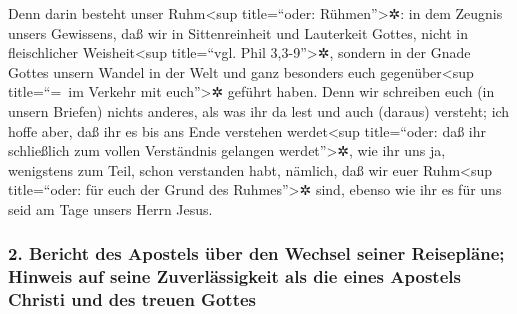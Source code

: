  Denn darin besteht unser Ruhm\textless sup title=``oder:
Rühmen''\textgreater✲: in dem Zeugnis unsers Gewissens, daß wir in
Sittenreinheit und Lauterkeit Gottes, nicht in fleischlicher
Weisheit\textless sup title=``vgl. Phil 3,3-9''\textgreater✲, sondern in
der Gnade Gottes unsern Wandel in der Welt und ganz besonders euch
gegenüber\textless sup title=``=~im Verkehr mit euch''\textgreater✲
geführt haben.  Denn wir schreiben euch (in unsern
Briefen) nichts anderes, als was ihr da lest und auch (daraus) versteht;
ich hoffe aber, daß ihr es bis ans Ende verstehen werdet\textless sup
title=``oder: daß ihr schließlich zum vollen Verständnis gelangen
werdet''\textgreater✲,  wie ihr uns ja, wenigstens zum
Teil, schon verstanden habt, nämlich, daß wir euer Ruhm\textless sup
title=``oder: für euch der Grund des Ruhmes''\textgreater✲ sind, ebenso
wie ihr es für uns seid am Tage unsers Herrn Jesus.

\hypertarget{bericht-des-apostels-uxfcber-den-wechsel-seiner-reisepluxe4ne-hinweis-auf-seine-zuverluxe4ssigkeit-als-die-eines-apostels-christi-und-des-treuen-gottes}{%
\subsubsection{2. Bericht des Apostels über den Wechsel seiner
Reisepläne; Hinweis auf seine Zuverlässigkeit als die eines Apostels
Christi und des treuen
Gottes}\label{bericht-des-apostels-uxfcber-den-wechsel-seiner-reisepluxe4ne-hinweis-auf-seine-zuverluxe4ssigkeit-als-die-eines-apostels-christi-und-des-treuen-gottes}}

